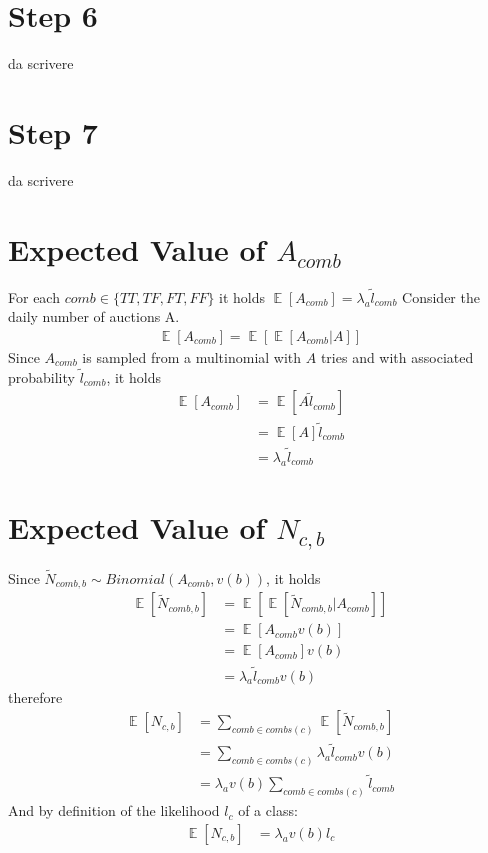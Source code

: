 \documentclass[11pt]{article} %
\DeclareMathOperator{\EX}{\mathbb{E}}
\begin{document}
\section{Step 6}
{\color{red}da scrivere}


\clearpage
\section{Step 7}
{\color{red}da scrivere}


\appendix

\section{Expected Value of $A_{comb}$}\label{sec.acombproof}
For each $comb \in \{TT,TF,FT,FF\}$ it holds $\EX[A_{comb}] = \lambda_a \tilde{l}_{comb}$
\newline
\newline
Consider the daily number of auctions A.
\begin{align*}
\EX\left[A_{comb}\right] = \EX\left[\EX\left[A_{comb}|A\right]\right]
\end{align*}
Since $A_{comb}$ is sampled from a multinomial with $A$ tries and with associated probability $\tilde{l}_{comb}$, it holds
\begin{align*}
\EX\left[A_{comb}\right] &= \EX\left[A\tilde{l}_{comb}\right]\\
&= \EX\left[A\right]\tilde{l}_{comb}\\
&= \lambda_a\tilde{l}_{comb}
\end{align*}

\section{Expected Value of $N_{c,b}$}\label{sec.ncbproof}
Since $\tilde{N}_{comb,b} \sim Binomial(A_{comb}, v(b))$, it holds
\begin{align*}
\EX\left[\tilde{N}_{comb,b}\right] &= \EX\left[\EX\left[\tilde{N}_{comb,b}| A_{comb}\right]\right]\\
 &= \EX\left[A_{comb}v(b)\right]\\
 &= \EX\left[A_{comb}\right]v(b)\\
&= \lambda_a\tilde{l}_{comb}v(b)
\end{align*}
therefore
\begin{align*}
\EX\left[N_{c,b}\right] &= \sum_{comb \in combs(c)}{\EX\left[\tilde{N}_{comb,b}\right]}\\
&= \sum_{comb \in combs(c)}{\lambda_a\tilde{l}_{comb}v(b)}\\
&= \lambda_av(b)\sum_{comb \in combs(c)}{\tilde{l}_{comb}}
\end{align*}
And by definition of the likelihood $l_c$ of a class:
\begin{align*}
\EX\left[N_{c,b}\right]&= \lambda_av(b)l_c
\end{align*}
\end{document}
